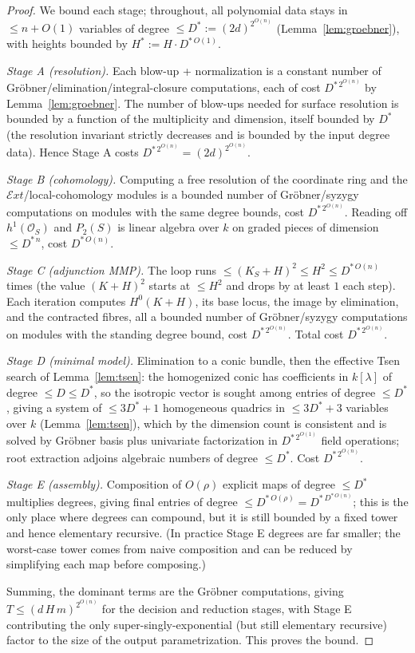 \documentclass{amsart}
\theoremstyle{plain}
\theoremstyle{definition}
\newcommand{\cO}{\mathcal{O}}
\begin{document}
\begin{proof}
We bound each stage; throughout, all polynomial data stays in $\le n+O(1)$
variables of degree $\le D^*:=(2d)^{2^{O(n)}}$ (Lemma~\ref{lem:groebner}), with
heights bounded by $H^*:=H\cdot D^{*\,O(1)}$.

\emph{Stage A (resolution).}  Each blow-up + normalization is a constant number
of Gr\"obner/elimination/integral-closure computations, each of cost
$D^{*\,2^{O(n)}}$ by Lemma~\ref{lem:groebner}.  The number of blow-ups needed for
surface resolution is bounded by a function of the multiplicity and dimension,
itself bounded by $D^*$ (the resolution invariant strictly decreases and is
bounded by the input degree data).  Hence Stage A costs $D^{*\,2^{O(n)}}=
(2d)^{2^{O(n)}}$.

\emph{Stage B (cohomology).}  Computing a free resolution of the coordinate ring
and the $\mathcal{E}xt$/local-cohomology modules is a bounded number of
Gr\"obner/syzygy computations on modules with the same degree bounds, cost
$D^{*\,2^{O(n)}}$.  Reading off $h^1(\cO_S)$ and $P_2(S)$ is linear algebra over
$k$ on graded pieces of dimension $\le D^{*\,n}$, cost $D^{*\,O(n)}$.

\emph{Stage C (adjunction MMP).}  The loop runs $\le(K_S+H)^2\le H^2\le
D^{*\,O(n)}$ times (the value $(K+H)^2$ starts at $\le H^2$ and drops by at least
$1$ each step).  Each iteration computes $H^0(K+H)$, its base locus, the image by
elimination, and the contracted fibres, all a bounded number of Gr\"obner/syzygy
computations on modules with the standing degree bound, cost $D^{*\,2^{O(n)}}$.
Total cost $D^{*\,2^{O(n)}}$.

\emph{Stage D (minimal model).}  Elimination to a conic bundle, then the
effective Tsen search of Lemma~\ref{lem:tsen}: the homogenized conic has
coefficients in $k[\lambda]$ of degree $\le D\le D^*$, so the isotropic vector is
sought among entries of degree $\le D^*$, giving a system of $\le 3D^*+1$
homogeneous quadrics in $\le 3D^*+3$ variables over $k$ (Lemma~\ref{lem:tsen}),
which by the dimension count is consistent and is solved by Gr\"obner basis
plus univariate factorization in $D^{*\,2^{O(1)}}$ field operations; root
extraction adjoins algebraic numbers of degree $\le D^*$.  Cost
$D^{*\,2^{O(n)}}$.

\emph{Stage E (assembly).}  Composition of $O(\rho)$ explicit maps of degree
$\le D^*$ multiplies degrees, giving final entries of degree $\le D^{*\,O(\rho)}=
D^{*\,D^{*\,O(n)}}$; this is the only place where degrees can compound, but it is
still bounded by a fixed tower and hence elementary recursive.  (In practice
Stage E degrees are far smaller; the worst-case tower comes from naive
composition and can be reduced by simplifying each map before composing.)

Summing, the dominant terms are the Gr\"obner computations, giving
$T\le(d\,H\,m)^{2^{O(n)}}$ for the decision and reduction stages, with Stage E
contributing the only super-singly-exponential (but still elementary recursive)
factor to the size of the output parametrization.  This proves the bound.
\end{proof}
\end{document}

